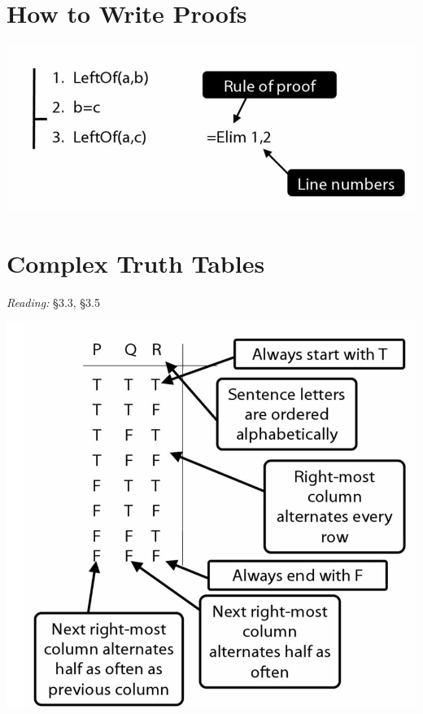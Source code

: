 \documentclass[12pt]{extarticle}
\begin{document}
\begin{multicols*}{3}
 
\section{How to Write Proofs}
 
\begin{center}
\includegraphics[scale=0.3]{img/how_to_write_proofs.png}
\end{center}
 
 
\section{Complex Truth Tables}
 
\emph{Reading:} §3.3, §3.5
 
\begin{center}
\includegraphics[scale=0.3]{img/how_to_write_truth_tables.png}
\end{center}
\begin{minipage}{\columnwidth}
 

\end{minipage}
\end{multicols*}
\end{document}

